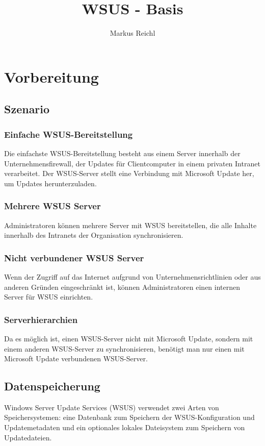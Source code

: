 \documentclass[a4paper,11pt]{article}
\title{WSUS - Basis}
\author{Markus Reichl}
\begin{document}
\maketitle

\section{Vorbereitung}
\subsection{Szenario}
\subsubsection{Einfache WSUS-Bereitstellung}
Die einfachste WSUS-Bereitstellung besteht aus einem Server innerhalb der Unternehmensfirewall, der Updates für Clientcomputer in einem privaten Intranet verarbeitet. 
Der WSUS-Server stellt eine Verbindung mit Microsoft Update her, um Updates herunterzuladen.
\subsubsection{Mehrere WSUS Server}
Administratoren können mehrere Server mit WSUS bereitstellen, die alle Inhalte innerhalb des Intranets der Organisation synchronisieren.
\subsubsection{Nicht verbundener WSUS Server}
Wenn der Zugriff auf das Internet aufgrund von Unternehmensrichtlinien oder aus anderen Gründen eingeschränkt ist, können Administratoren einen internen Server für WSUS einrichten.
\subsubsection{Serverhierarchien}
Da es möglich ist, einen WSUS-Server nicht mit Microsoft Update, sondern mit einem anderen WSUS-Server zu synchronisieren, benötigt man nur einen mit Microsoft Update verbundenen WSUS-Server.

\subsection{Datenspeicherung}
Windows Server Update Services (WSUS) verwendet zwei Arten von Speichersystemen: eine Datenbank zum Speichern der WSUS-Konfiguration und Updatemetadaten und ein optionales lokales Dateisystem zum Speichern von Updatedateien.
\end{document}
